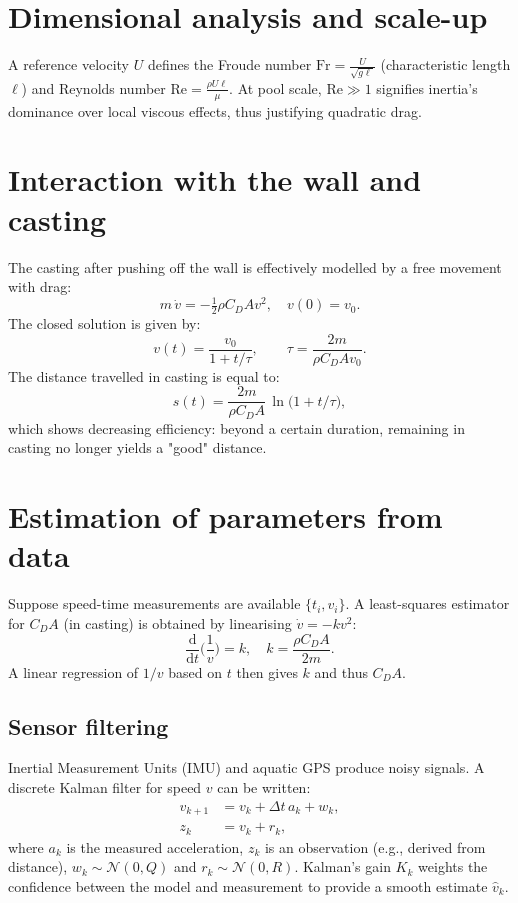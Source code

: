 \documentclass[12pt,a4paper]{article}
\newcommand{\dd}{\mathrm{d}}
\begin{document}
\section{Dimensional analysis and scale-up}
A reference velocity $U$ defines the Froude number $\mathrm{Fr}=\frac{U}{\sqrt{g\ell}}$ (characteristic length $\ell$) and Reynolds number $\mathrm{Re}=\frac{\rho U \ell}{\mu}$. At pool scale, $\mathrm{Re}\gg 1$ signifies inertia's dominance over local viscous effects, thus justifying quadratic drag.

\section{Interaction with the wall and casting}
The casting after pushing off the wall is effectively modelled by a free movement with drag:
\begin{equation}
 m\,\dot v = - \tfrac{1}{2}\rho C_D A v^2, \quad v(0)=v_0.
 \end{equation}
The closed solution is given by:
\begin{equation}
 v(t) = \frac{v_0}{1+ t/\tau}, \qquad \tau = \frac{2m}{\rho C_D A v_0}.
 \end{equation}
The distance travelled in casting is equal to:
\begin{equation}
 s(t) = \frac{2m}{\rho C_D A}\,\ln\big(1+t/\tau\big),
 \end{equation}
which shows decreasing efficiency: beyond a certain duration, remaining in casting no longer yields a "good" distance.

\section{Estimation of parameters from data}
Suppose speed-time measurements are available $\{t_i,v_i\}$. A least-squares estimator for $C_D A$ (in casting) is obtained by linearising $\dot v = -k v^2$:
\begin{equation}
 \frac{\dd}{\dd t}\Big(\frac{1}{v}\Big) = k, \quad k=\frac{\rho C_D A}{2m}.
 \end{equation}
A linear regression of $1/v$ based on $t$ then gives $k$ and thus $C_D A$.

\subsection{Sensor filtering}
Inertial Measurement Units (IMU) and aquatic GPS produce noisy signals. A discrete Kalman filter for speed $v$ can be written:
\begin{align}
 v_{k+1} &= v_k + \Delta t\,a_k + w_k, \\
 z_k &= v_k + r_k,
 \end{align}
where $a_k$ is the measured acceleration, $z_k$ is an observation (e.g., derived from distance), $w_k\sim\mathcal{N}(0,Q)$ and $r_k\sim\mathcal{N}(0,R)$. Kalman's gain $K_k$ weights the confidence between the model and measurement to provide a smooth estimate $\hat v_k$.
\end{document}
